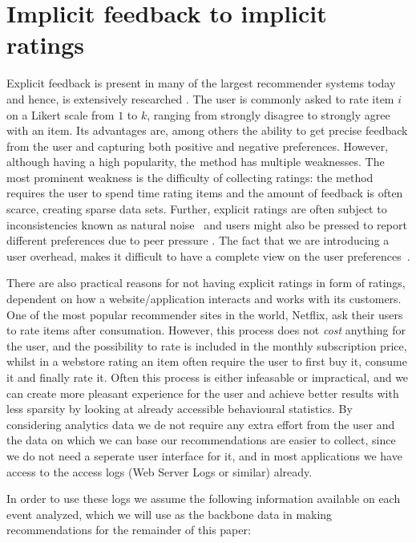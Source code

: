 
\label{implicit-feedback}
\section{Implicit feedback to implicit ratings}
\label{sec:implicit}

Explicit feedback is present in many of the largest recommender systems today
and hence, is extensively researched \cite{Adomavicius2005}. The user is
commonly asked to rate item $i$ on a Likert scale from $1$ to $k$, ranging from
strongly disagree to strongly agree with an item. Its advantages are, among
others the ability to get precise feedback from the user and capturing both
positive and negative preferences. However, although having a high popularity,
the method has multiple weaknesses. The most prominent weakness is the
difficulty of collecting ratings: the method requires the user to spend time
rating items and the amount of feedback is often scarce, creating sparse data
sets. Further, explicit ratings are often subject to inconsistencies known as
natural noise~\cite{amatriain2009like} and users might also be pressed to
report different preferences due to peer pressure \cite{bell2007scalable}. The
fact that we are introducing a user overhead, makes it difficult to have a
complete view on the user preferences~\cite{Jawaheer2010}.

There are also practical reasons for not having explicit ratings in form of
ratings, dependent on how a website/application interacts and works with its
customers. One of the most popular recommender sites in the world, Netflix, ask
their users to rate items after consumation. However, this process does not
\textit{cost} anything for the user, and the possibility to rate is included in
the monthly subscription price, whilst in a webstore rating an item often
require the user to first buy it, consume it and finally rate it. Often this
process is either infeasable or impractical, and we can create more pleasant
experience for the user and achieve better results with less sparsity by
looking at already accessible behavioural statistics. By considering analytics
data we de not require any extra effort from the user and the data on which we
can base our recommendations are easier to collect, since we do not need a
seperate user interface for it, and in most applications we have access to the
access logs (Web Server Logs or similar) already.

In order to use these logs we assume the following information available on
each event analyzed, which we will use as the backbone data in making
recommendations for the remainder of this paper:

